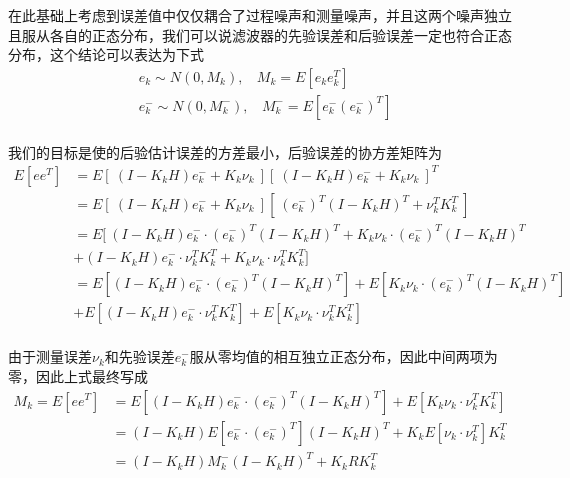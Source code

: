 在此基础上考虑到误差值中仅仅耦合了过程噪声和测量噪声，并且这两个噪声独立且服从各自的正态分布，我们可以说滤波器的先验误差和后验误差一定也符合正态分布，这个结论可以表达为下式
\begin{equation}
    \begin{aligned}
        & e_k\sim N(0,M_k),\ \ \ \ M_k=E[e_ke^T_k]\\
        & e^{-}_k\sim N(0,M^{-}_k),\ \ \ \ M^{-}_k=E[e^{-}_k(e^{-}_k)^T]\\
    \end{aligned}
\end{equation}

我们的目标是使的后验估计误差的方差最小，后验误差的协方差矩阵为
\begin{equation}
    \begin{aligned}
        E[ee^T]&=E\left[\ (I-K_kH)e^{-}_k+K_k\nu_k \ \right]\left[\ (I-K_kH)e^{-}_k+K_k\nu_k \ \right]^T\\
        &=E\left[\ (I-K_kH)e^{-}_k+K_k\nu_k \ \right]\left[\ (e^{-}_k)^T(I-K_kH)^T+\nu^T_kK^T_k \ \right]\\
        &=E[\ (I-K_kH)e^{-}_k\cdot (e^{-}_k)^T(I-K_kH)^T+K_k\nu_k\cdot (e^{-}_k)^T(I-K_kH)^T  \\
        &+(I-K_kH)e^{-}_k\cdot \nu^T_kK^T_k+K_k\nu_k\cdot  \nu^T_kK^T_k]\\
        &=E[(I-K_kH)e^{-}_k\cdot (e^{-}_k)^T(I-K_kH)^T]+E[K_k\nu_k\cdot (e^{-}_k)^T(I-K_kH)^T]\\
        &+E[(I-K_kH)e^{-}_k\cdot \nu^T_kK^T_k]+E[K_k\nu_k\cdot  \nu^T_kK^T_k]\\
    \end{aligned}
\end{equation}

由于测量误差$\nu_k$和先验误差$e^{-}_k$服从零均值的相互独立正态分布，因此中间两项为零，因此上式最终写成
\begin{equation}
\begin{aligned}
   M_k=E[ee^T]
    &=E[(I-K_kH)e^{-}_k\cdot (e^{-}_k)^T(I-K_kH)^T]+E[K_k\nu_k\cdot  \nu^T_kK^T_k]\\
    &=(I-K_kH)E[e^{-}_k\cdot (e^{-}_k)^T](I-K_kH)^T+K_kE[\nu_k\cdot  \nu^T_k]K^T_k\\
    &=(I-K_kH)M^{-}_k(I-K_kH)^T+K_kRK_k^T
\end{aligned}
\end{equation}

